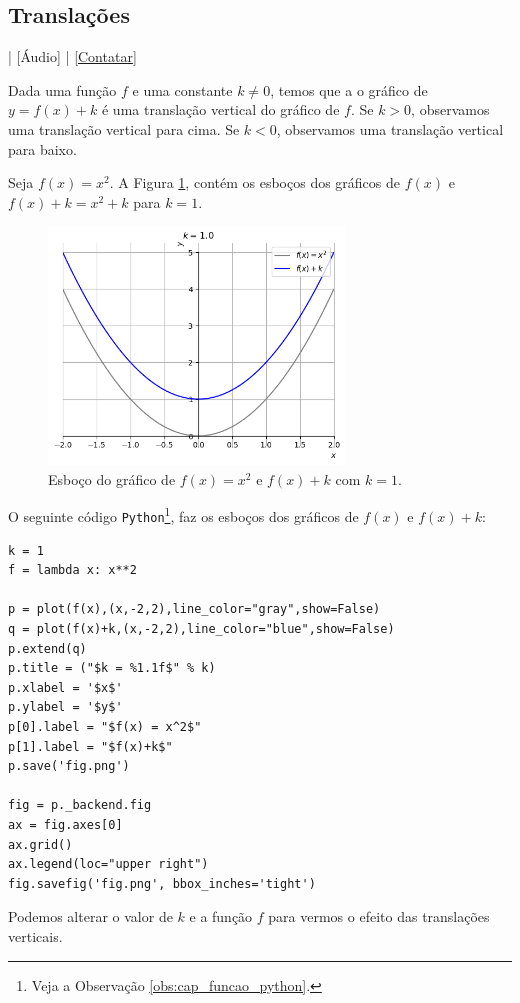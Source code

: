 \subsection{Translações}

\begin{flushright}
  [Vídeo] | [Áudio] | \href{https://phkonzen.github.io/notas/contato.html}{[Contatar]}
\end{flushright}

Dada uma função $f$ e uma constante $k\neq 0$, temos que a o gráfico de $y = f(x) + k$ é uma translação vertical do gráfico de $f$. Se $k>0$, observamos uma translação vertical para cima. Se $k<0$, observamos uma translação vertical para baixo.

\begin{ex}
  Seja $f(x) = x^2$. A Figura \ref{fig:ex_trans_vert}, contém os esboços dos gráficos de $f(x)$ e $f(x)+k = x^2+k$ para $k=1$.

  \begin{figure}[H]
    \centering
    \includegraphics[width=0.7\textwidth]{./cap_funcao/dados/fig_ex_transvert/fig_ex_transvert}
    \caption{Esboço do gráfico de $f(x) = x^2$ e $f(x)+k$ com $k=1$.}
    \label{fig:ex_trans_vert}
  \end{figure}

  \ifispython
  O seguinte código \verb+Python+\footnote{Veja a Observação \ref{obs:cap_funcao_python}.}, faz os esboços dos gráficos de $f(x)$ e $f(x)+k$:
\begin{verbatim}
k = 1
f = lambda x: x**2

p = plot(f(x),(x,-2,2),line_color="gray",show=False)
q = plot(f(x)+k,(x,-2,2),line_color="blue",show=False)
p.extend(q)
p.title = ("$k = %1.1f$" % k)
p.xlabel = '$x$'
p.ylabel = '$y$'
p[0].label = "$f(x) = x^2$"
p[1].label = "$f(x)+k$"
p.save('fig.png')

fig = p._backend.fig
ax = fig.axes[0]
ax.grid()
ax.legend(loc="upper right")
fig.savefig('fig.png', bbox_inches='tight')
\end{verbatim}
  Podemos alterar o valor de $k$ e a função $f$ para vermos o efeito das translações verticais.
  \fi
\end{ex}

